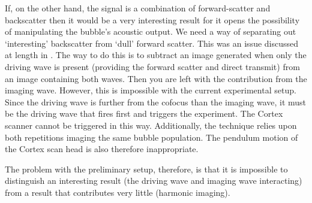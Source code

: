 {  If, on the other hand, the signal is a combination of forward-scatter and backscatter then it would be a very interesting result for it opens the possibility of manipulating the bubble's acoustic output.
  We need a way of separating out `interesting' backscatter from `dull' forward scatter.
  This was an issue discussed at length in .
  The way to do this is to subtract an image generated when only the driving wave is present (providing the forward scatter and direct transmit)
  from an image containing both waves.
  Then you are left with the contribution from the imaging wave.
  However, this is impossible with the current experimental setup.
  Since the driving wave is further from the cofocus than the imaging wave,
  it must be the driving wave that fires first and triggers the experiment.
  The Cortex scanner cannot be triggered in this way.
  Additionally, the technique relies upon both repetitions imaging the same bubble population.
  The pendulum motion of the Cortex scan head is also therefore  inappropriate.
}

 The problem with the preliminary setup, therefore,  is that it is impossible to distinguish an interesting result (the driving wave and imaging wave interacting)
 from a result that contributes very little (harmonic imaging).
 







%










